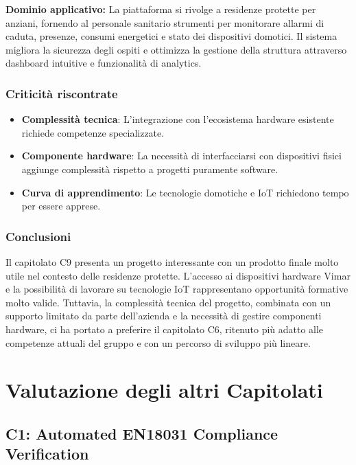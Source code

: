 \documentclass[11pt,a4paper]{article}
\begin{document}
\vspace{0.5cm}

\noindent \textbf{Dominio applicativo:} La piattaforma si rivolge a residenze protette per anziani, fornendo al personale sanitario strumenti per monitorare allarmi di caduta, presenze, consumi energetici e stato dei dispositivi domotici. Il sistema migliora la sicurezza degli ospiti e ottimizza la gestione della struttura attraverso dashboard intuitive e funzionalità di analytics.

\subsubsection{Criticità riscontrate}
\begin{itemize}
    \item \textbf{Complessità tecnica}: L'integrazione con l'ecosistema hardware esistente richiede competenze specializzate.
    \item \textbf{Componente hardware}: La necessità di interfacciarsi con dispositivi fisici aggiunge complessità rispetto a progetti puramente software.
    \item \textbf{Curva di apprendimento}: Le tecnologie domotiche e IoT richiedono tempo per essere apprese.
\end{itemize}

\subsubsection{Conclusioni}
Il capitolato C9 presenta un progetto interessante con un prodotto finale molto utile nel contesto delle residenze protette. L'accesso ai dispositivi hardware Vimar e la possibilità di lavorare su tecnologie IoT rappresentano opportunità formative molto valide. Tuttavia, la complessità tecnica del progetto, combinata con un supporto limitato da parte dell'azienda e la necessità di gestire componenti hardware, ci ha portato a preferire il capitolato C6, ritenuto più adatto alle competenze attuali del gruppo e con un percorso di sviluppo più lineare.

\newpage
\section{Valutazione degli altri Capitolati}
\subsection{C1: Automated EN18031 Compliance Verification}
\end{document}
